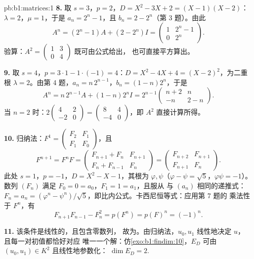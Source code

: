 \begin{solution}{pb:b1:matrices:1}
\textbf{8.} 取 $s = 3$，$p = 2$，$D = X^2 - 3X + 2 = (X - 1)(X -
2)$：$\lambda = 2$，$\mu = 1$，于是 $a_n = 2^n - 1$，且 $b_n = 2 -
2^n$（第 3 题）。由此
\[
A^n = (2^n - 1)A + (2 - 2^n)I
= \begin{pmatrix} 1 & 2^n - 1\\ 0 & 2^n \end{pmatrix}.
\]
验算：$A^2 = \begin{pmatrix} 1 & 3\\ 0 & 4\end{pmatrix}$ 既可由公式给出，
也可直接平方算出。

\textbf{9.} 取 $s = 4$，$p = 3\cdot1 - 1\cdot(-1) = 4$：$D = X^2 -
4X + 4 = (X - 2)^2$，为二重根 $\lambda = 2$。由第 4 题，$a_n
= n\,2^{n-1}$，$b_n = (1 - n)2^n$，于是
\[
A^n = n\,2^{n-1}A + (1 - n)2^n I
= 2^{n-1}\begin{pmatrix} n + 2 & n\\ -n & 2 - n
\end{pmatrix}.
\]
当 $n = 2$ 时：$2\begin{pmatrix} 4 & 2\\ -2 & 0\end{pmatrix} =
\begin{pmatrix} 8 & 4\\ -4 & 0 \end{pmatrix}$，即 $A^2$
直接计算所得。

\textbf{10.} 归纳法：$F^1 = \begin{pmatrix} F_2 & F_1\\ F_1 &
F_0\end{pmatrix}$，且
\[
F^{n+1} = F^n F =
\begin{pmatrix} F_{n+1} + F_n & F_{n+1}\\
F_n + F_{n-1} & F_n \end{pmatrix}
= \begin{pmatrix} F_{n+2} & F_{n+1}\\ F_{n+1} & F_n
\end{pmatrix}.
\]
此处 $s = 1$，$p = -1$，$D = X^2 - X - 1$，其根为 $\varphi,
\psi$（$\varphi - \psi = \sqrt5$，$\varphi\psi = -1$）。
数列 $(F_n)$ 满足 $F_0 = 0 = a_0$，$F_1 = 1 = a_1$，且服从
与 $(a_n)$ 相同的递推式：$F_n = a_n = (\varphi^n -
\psi^n)/\sqrt5$，即比内公式。卡西尼恒等式：应用第 7 题的
乘法性于 $F^n$，有
\[
F_{n+1}F_{n-1} - F_n^2 = p(F^n) = p(F)^n = (-1)^n .
\]

\textbf{11.} 该条件是线性的，且包含零数列，
故为。由归纳法，$u_0, u_1$ 线性地决定 $u$，
且每一对初值都恰好对应
唯一一个解：仿\cref{exo:b1:findim:10}，$E_D$
可由 $(u_0, u_1) \in K^2$ 且线性地参数化：
$\dim E_D = 2$.


\end{solution}
